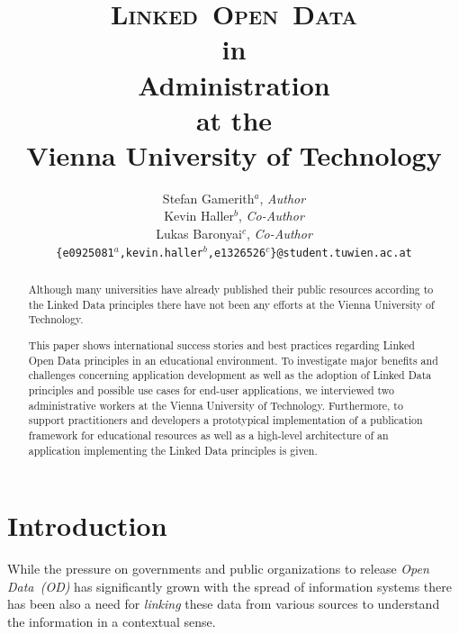 \documentclass{article}
\begin{document}
\renewcommand{\bibname}{References}

\pagestyle{plain}

\title{\textsc{\textbf{L}inked~\textbf{O}pen~\textbf{D}ata}\\in\\Administration\\at the\\Vienna University of Technology}
\date{}
\author{Stefan Gamerith$^a$, \textit{Author}\\
Kevin Haller$^b$, \textit{Co-Author}\\
Lukas Baronyai$^c$, \textit{Co-Author}\\
\texttt{\{e0925081$^a$,kevin.haller$^b$,e1326526$^c$\}@student.tuwien.ac.at}}

\maketitle
\thispagestyle{empty}

\begin{abstract}
Although many universities have already published their public resources according to the Linked Data principles there 
have not been any efforts at the Vienna University of Technology.

This paper shows international success stories and best practices 
regarding Linked Open Data principles in an educational environment. To investigate major benefits and challenges concerning application 
development as well as the adoption of Linked Data principles and possible use cases for end-user applications, we interviewed two 
administrative workers at the Vienna University of Technology. Furthermore, to support practitioners and developers a prototypical 
implementation of a publication framework for educational resources as well as a high-level architecture of an application implementing the Linked Data principles
is given. 



\end{abstract}

\newpage
\tableofcontents
\thispagestyle{empty}

\newpage
{}

\section{Introduction}
While the pressure on governments and public organizations to release \textit{Open Data~(OD)} has significantly grown with the spread of information systems there has been also a need for \textit{linking} these data from various sources to understand the information in a contextual sense.
\end{document}
